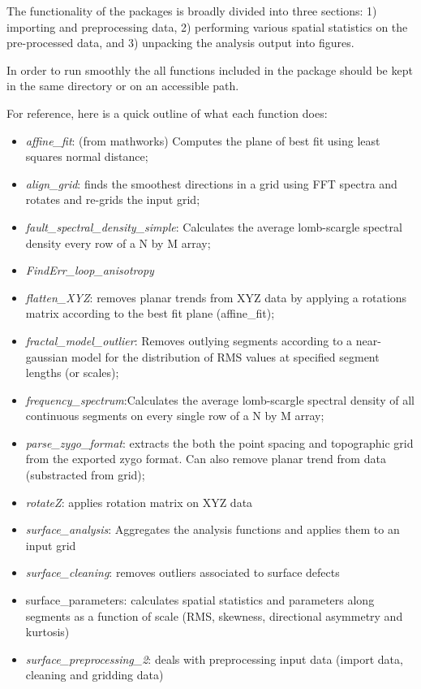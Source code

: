 \documentclass[12pt,a4paper]{article}
\begin{document}
\begin{itemize}
The functionality of the packages is broadly divided into three sections: 1) importing and preprocessing data, 2) performing various spatial statistics on the pre-processed data, and 3) unpacking the analysis output into figures.

In order to run smoothly the all functions included in the package should be kept in the same directory or on an accessible path. 

For reference, here is a quick outline of what each function does:

\begin{itemize}
	\item[] \textit{affine\_fit}: (from mathworks) Computes the plane of best fit using least squares normal distance;
	\item[] \textit{align\_grid}: finds the smoothest directions in a grid using FFT spectra and rotates and re-grids the input grid;
	\item[] \textit{fault\_spectral\_density\_simple}: Calculates the average lomb-scargle spectral density every row of a N by M array;
	\item[] \textit{FindErr\_loop\_anisotropy}
	\item[] \textit{flatten\_XYZ}: removes planar trends from XYZ data by applying a rotations matrix according to the best fit plane (affine\_fit);
	\item[] \textit{fractal\_model\_outlier}: Removes outlying segments according to a near-gaussian model for the distribution of RMS values at specified segment lengths (or scales);
	\item[] \textit{frequency\_spectrum}:Calculates the average lomb-scargle spectral density of all continuous 	segments on every single row of a N by M array;
	\item[] \textit{parse\_zygo\_format}: extracts the both the point spacing and topographic grid from the exported zygo format. Can also remove planar trend from data (substracted from grid);
	\item[] \textit{rotateZ}: applies rotation matrix on XYZ data
	\item[] \textit{surface\_analysis}: Aggregates the analysis functions and applies them to an input grid
	\item[] \textit{surface\_cleaning}: removes outliers associated to surface defects
	\item[] surface\_parameters: calculates spatial statistics and parameters along segments as a function of scale (RMS, skewness, directional asymmetry and kurtosis)
	\item[] \textit{surface\_preprocessing\_2}: deals with preprocessing input data (import data, cleaning and gridding data)
\end{itemize}
\end{itemize}
\end{document}
